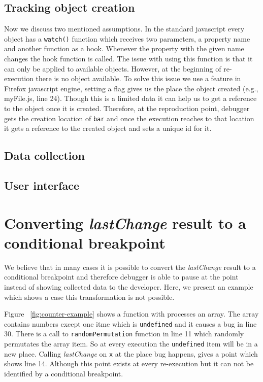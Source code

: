 \documentclass[preprint]{sigplanconf}
\begin{document}
\subsection{Tracking object creation}
Now we discuss two mentioned assumptions. In the standard javascript every object has a \texttt{watch()} function which receives two parameters, a property name and another function as a hook. Whenever the property with the given name changes the hook function is called. The issue with using this function is that it can only be applied to available objects. However, at the beginning of re-execution there is no object available. To solve this issue we use a feature in Firefox javascript engine, setting a flag gives us the place the object created (e.g., myFile.js, line 24). Though this is a limited data it can help us to get a reference to the object once it is created. Therefore, at the reproduction point, debugger gets the creation location of \texttt{bar} and once the execution reaches to that location it gets a reference to the created object and sets a unique id for it.

\subsection{Data collection}

\subsection{User interface}

\section{Converting \textit{lastChange} result to a conditional breakpoint}
We believe that in many cases it is possible to convert the \textit{lastChange} result to a conditional breakpoint and therefore debugger is able to pause at the point
 instead of showing collected data to the developer. Here, we present an example which shows a case this transformation is not possible.

Figure ~\ref{fig:counter-example} shows a function with processes an array. The array contains numbers except one itme which is \texttt{undefined} and it causes a bug in line 30. There is a call to \texttt{randomPermutation} function in line 11 which randomly permutates the array item. So at every execution the \texttt{undefined} item will be in a new place. Calling \textit{lastChange} on \texttt{x} at the place bug happens, gives a point which shows line 14. Although this point exists at every re-execution but it can not be identified by a conditional breakpoint. 
\end{document}
